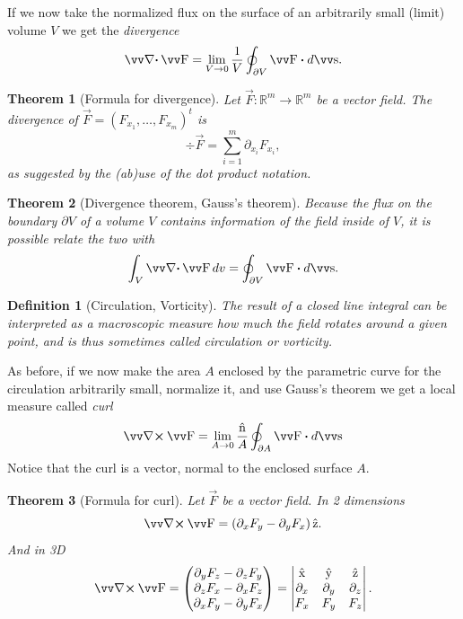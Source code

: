 \documentclass[twocolumn, margin=small]{tex/hsrzf}
\theoremstyle{fuvarzf}
\newtheorem{theorem}{Theorem}
\newtheorem{definition}{Definition}
\begin{document}
If we now take the normalized flux on the surface of an arbitrarily small
(limit) volume \(V\) we get the \emph{divergence}
\[
  \div \vec{F} = \lim_{V\to 0} \frac{1}{V} \oint_{\partial V} \vec{F}\dotp d\vec{s} .
\]

\begin{theorem}[Formula for divergence]
  Let \(\vec{F}: \mathbb{R}^m \to \mathbb{R}^m\) be a vector field.
  The divergence of \(\vec{F} = (F_{x_1},\ldots, F_{x_m})^t\) is
  \[
    \div\vec{F} = \sum_{i = 1}^m \partial_{x_i} F_{x_i} ,
  \]
  as suggested by the (ab)use of the dot product notation.
\end{theorem}

\begin{theorem}[Divergence theorem, Gauss's theorem]
  Because the flux on the boundary \(\partial V\) of a volume \(V\) contains
  information of the field inside of \(V\), it is possible relate the two with
  \[
    \int_V \div \vec{F} \,dv = \oint_{\partial V} \vec{F} \dotp d\vec{s} .
  \]
\end{theorem}

\begin{definition}[Circulation, Vorticity]
  The result of a closed line integral can be interpreted as a macroscopic
  measure how much the field rotates around a given point, and is thus
  sometimes called \emph{circulation} or \emph{vorticity}.
\end{definition}

As before, if we now make the area \(A\) enclosed by the parametric curve for
the circulation arbitrarily small, normalize it, and use Gauss's theorem we get
a local measure called \emph{curl}
\[
  \curl \vec{F} =
  \lim_{A\to 0} \frac{\uvec{n}}{A} \oint_{\partial A} \vec{F} \dotp d\vec{s}
\]
Notice that the curl is a vector, normal to the enclosed surface \(A\).

\begin{theorem}[Formula for curl]
  Let \(\vec{F}\) be a vector field. In 2 dimensions
  \[
    \curl \vec{F} = \left(\partial_x F_y - \partial_y F_x\right)\uvec{z}.
  \]
  And in 3D
  \[
    \curl \vec{F} = \begin{pmatrix}
      \partial_y F_z - \partial_z F_y \\
      \partial_z F_x - \partial_x F_z \\
      \partial_x F_y - \partial_y F_x
    \end{pmatrix}
    = \begin{vmatrix}
      \uvec{x} & \uvec{y} & \uvec{z} \\
      \partial_x & \partial_y & \partial_z \\
      F_x & F_y & F_z
    \end{vmatrix} .
  \]
\end{theorem}
\end{document}
